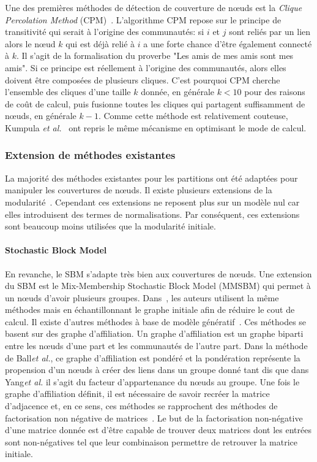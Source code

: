 Une des premières méthodes de détection de couverture de n\oe uds est la \emph{Clique Percolation Method} (CPM)~\cite{Palla2005}.
L'algorithme CPM repose sur le principe de transitivité qui serait à l'origine des communautés: si $i$ et $j$ sont reliés par un lien alors le n\oe ud $k$ qui est déjà relié à $i$ a une forte chance d'être également connecté à $k$.
Il s'agit de la formalisation du proverbe "Les amis de mes amis sont mes amis".
Si ce principe est réellement à l'origine des communautés, alors elles doivent être composées de plusieurs cliques.
C'est pourquoi CPM cherche l'ensemble des cliques d'une taille $k$ donnée, en générale $k<10$ pour des raisons de coût de calcul, puis fusionne toutes les cliques qui partagent suffisamment de n\oe uds, en générale $k-1$. 
Comme cette méthode est relativement couteuse, Kumpula \emph{et al.}~\cite{Kumpula2008} ont repris le même mécanisme en optimisant le mode de calcul.

\subsubsection{Extension de méthodes existantes}

La majorité des méthodes existantes pour les partitions ont été adaptées pour manipuler les couvertures de n\oe uds.
Il existe plusieurs extensions de la modularité~\cite{Shen2009,Nicosia2009}.
Cependant ces extensions ne reposent plus sur un modèle nul car elles introduisent des termes de normalisations.
Par conséquent, ces extensions sont beaucoup moins utilisées que la modularité initiale.

\paragraph{Stochastic Block Model}
En revanche, le SBM s'adapte très bien aux couvertures de n\oe uds.
Une extension du SBM est le Mix-Membership Stochastic Block Model (MMSBM)\cite{Airoldi2008} qui permet à un n\oe uds d'avoir plusieurs groupes.
Dans~\cite{Gopalan2013a}, les auteurs utilisent la même méthodes mais en échantillonnant le graphe initiale afin de réduire le cout de calcul.
Il existe d'autres méthodes à base de modèle génératif~\cite{Ball2011,Yang2013}.
Ces méthodes se basent sur des graphe d'affiliation\cite{BreigerRonald1974}.
Un graphe d'affiliation est un graphe biparti entre les n\oe uds d'une part et les communautés de l'autre part.
Dans la méthode de Ball\emph{et al.}, ce graphe d'affiliation est pondéré et la pondération représente la propension d'un n\oe uds à créer des liens dans un groupe donné tant dis que dans Yang\emph{et al.} il s'agit du facteur d'appartenance du n\oe uds au groupe.
Une fois le graphe d'affiliation définit, il est nécessaire de savoir recréer la matrice d'adjacence et, en ce sens, ces méthodes se rapprochent des méthodes de factorisation non négative de matrices~\cite{Lee1999}.
Le but de la factorisation non-négative d'une matrice donnée est d'être capable de trouver deux matrices dont les entrées sont non-négatives tel que leur combinaison permettre de retrouver la matrice initiale.

